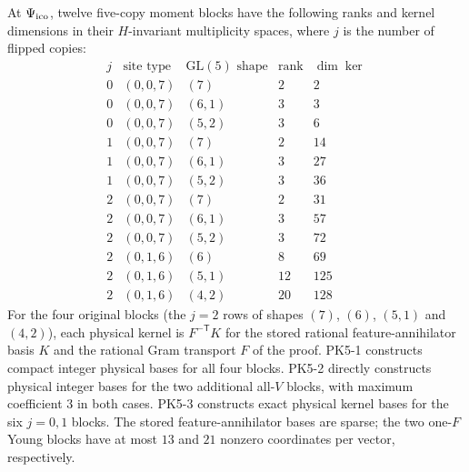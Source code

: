\begin{proposition}
\label{prop:ico-fivecopy-g34-kernels}
At $\Psi_{\rm ico}$, twelve five-copy moment blocks have the
following ranks and kernel dimensions in their $H$-invariant
multiplicity spaces, where $j$ is the number of flipped copies:
\[
\begin{array}{cc|c|cc}
 j&\text{site type}&\mathrm{GL}(5)\text{ shape} & \operatorname{rank} & \dim\ker\\ \hline
0&(0,0,7)&(7)&2&2\\
0&(0,0,7)&(6,1)&3&3\\
0&(0,0,7)&(5,2)&3&6\\
1&(0,0,7)&(7)&2&14\\
1&(0,0,7)&(6,1)&3&27\\
1&(0,0,7)&(5,2)&3&36\\
2&(0,0,7)&(7)&2&31\\
2&(0,0,7)&(6,1)&3&57\\
2&(0,0,7)&(5,2)&3&72\\
2&(0,1,6)&(6)&8&69\\
2&(0,1,6)&(5,1)&12&125\\
2&(0,1,6)&(4,2)&20&128
\end{array}
\]
For the four original blocks (the $j=2$ rows of shapes $(7)$, $(6)$, $(5,1)$ and $(4,2)$), each physical kernel is $F^{-\mathsf T}K$ for the stored rational
feature-annihilator basis $K$ and the rational Gram transport $F$
of the proof. PK5-1 constructs compact integer physical bases for all four
blocks.
PK5-2 directly constructs physical integer bases for the two additional
all-$V$ blocks, with maximum coefficient $3$ in both cases.
PK5-3 constructs exact physical kernel bases for the six $j=0,1$ blocks.
The stored feature-annihilator bases are sparse; the two one-$F$ Young blocks have at most
$13$ and $21$ nonzero coordinates per vector, respectively.
\end{proposition}
